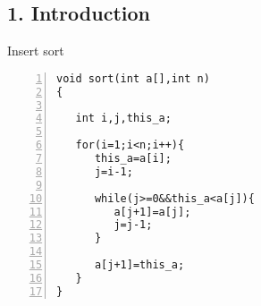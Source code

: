 \documentclass{beamer}
\begin{document}
\subsection*{1. Introduction}


\begin{frame}[fragile]{Insert sort}
\begin{lstlisting}[numbers=left]
void sort(int a[],int n)
{

   int i,j,this_a;

   for(i=1;i<n;i++){
      this_a=a[i];
      j=i-1;

      while(j>=0&&this_a<a[j]){
         a[j+1]=a[j];
         j=j-1;
      }

      a[j+1]=this_a;
   }
}
\end{lstlisting}
\end{frame}
\end{document}
